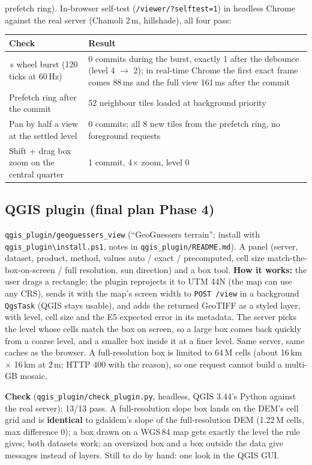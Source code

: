 ﻿\documentclass[11pt,a4paper]{article}
\newcommand{\code}[1]{\texttt{#1}}
\begin{document}
prefetch ring). In-browser self-test (\code{/viewer/?selftest=1}) in headless Chrome against the real server
(Chamoli 2\,m, hillshade), all four pass:
\begin{center}\small
\begin{tabularx}{\linewidth}{>{\raggedright\arraybackslash}p{5.0cm}L}
\toprule
Check & Result \\
\,s wheel burst (120 ticks at 60\,Hz) & 0 commits during the burst, exactly 1 after the debounce (level 4 $\to$ 2); in
real-time Chrome the first exact frame comes 88\,ms and the full view 161\,ms after the commit \\
Prefetch ring after the commit & 52 neighbour tiles loaded at background priority \\
Pan by half a view at the settled level & 0 commits; all 8 new tiles from the prefetch ring, no foreground requests \\
Shift + drag box zoom on the central quarter & 1 commit, 4$\times$ zoom, level 0 \\
\bottomrule
\end{tabularx}
\end{center}

\subsection{QGIS plugin (final plan Phase 4)}\label{sec:p5qgis}
\code{qgis\_plugin/geoguessers\_view} (``GeoGuessers terrain''; install with \code{qgis\_plugin\textbackslash install.ps1},
notes in \code{qgis\_plugin/README.md}). A panel (server, dataset, product, method, values auto / exact / precomputed,
cell size match-the-box-on-screen / full resolution, sun direction) and a box tool. \textbf{How it works:} the user drags
a rectangle; the plugin reprojects it to UTM 44N (the map can use any CRS), sends it with the map's screen width to
\code{POST /view} in a background \code{QgsTask} (QGIS stays usable), and adds the returned GeoTIFF as a styled layer,
with level, cell size and the E5 expected error in its metadata. The server picks the level whose cells match the
box on screen, so a large box comes back quickly from a coarse level, and a smaller box inside it at a finer level.
Same server, same caches as the browser. A full-resolution box is limited to 64\,M cells (about 16\,km $\times$ 16\,km at
2\,m; HTTP 400 with the reason), so one request cannot build a multi-GB mosaic.

\textbf{Check} (\code{qgis\_plugin/check\_plugin.py}, headless, QGIS 3.44's Python against the real server): 13/13 pass.
A full-resolution slope box lands on the DEM's cell grid and is \textbf{identical} to gdaldem's slope of the
full-resolution DEM (1.22\,M cells, max difference 0); a box drawn on a WGS\,84 map gets exactly the level the rule
gives; both datasets work; an oversized box and a box outside the data give messages instead of layers. Still to do by
hand: one look in the QGIS GUI.
\end{document}

